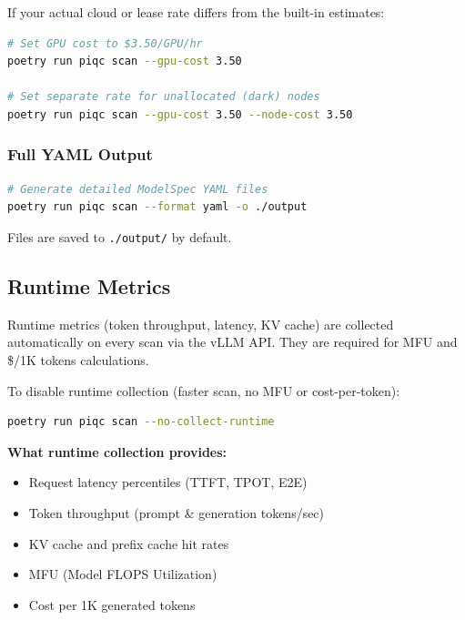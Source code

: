 \documentclass[11pt,a4paper]{article}
\begin{document}
If your actual cloud or lease rate differs from the built-in estimates:

\begin{lstlisting}[language=bash]
# Set GPU cost to $3.50/GPU/hr
poetry run piqc scan --gpu-cost 3.50

# Set separate rate for unallocated (dark) nodes
poetry run piqc scan --gpu-cost 3.50 --node-cost 3.50
\end{lstlisting}

\subsubsection{Full YAML Output}

\begin{lstlisting}[language=bash]
# Generate detailed ModelSpec YAML files
poetry run piqc scan --format yaml -o ./output
\end{lstlisting}

Files are saved to \texttt{./output/} by default.

\subsection{Runtime Metrics}

Runtime metrics (token throughput, latency, KV cache) are collected automatically on every scan via the vLLM API. They are required for MFU and \$/1K tokens calculations.

To disable runtime collection (faster scan, no MFU or cost-per-token):

\begin{lstlisting}[language=bash]
poetry run piqc scan --no-collect-runtime
\end{lstlisting}

\textbf{What runtime collection provides:}
\begin{itemize}
    \item Request latency percentiles (TTFT, TPOT, E2E)
    \item Token throughput (prompt \& generation tokens/sec)
    \item KV cache and prefix cache hit rates
    \item MFU (Model FLOPS Utilization)
    \item Cost per 1K generated tokens
\end{itemize}

\end{document}

